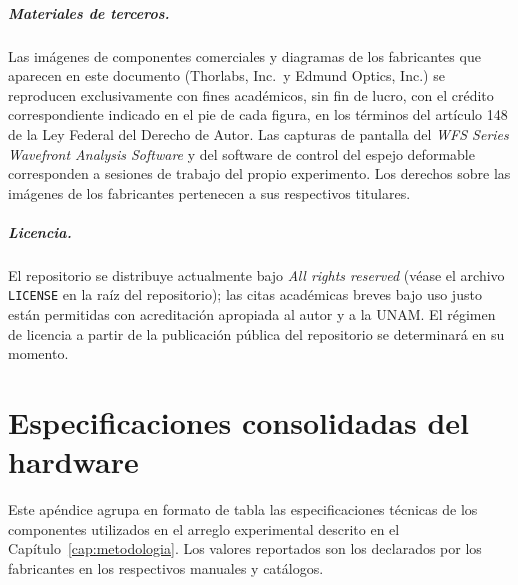 \documentclass[letterpaper,12pt,oneside]{book}
\begin{document}
\paragraph{Materiales de terceros.} Las imágenes de componentes comerciales y diagramas de
los fabricantes que aparecen en este documento (Thorlabs, Inc.\ y Edmund Optics, Inc.) se
reproducen exclusivamente con fines académicos, sin fin de lucro, con el crédito
correspondiente indicado en el pie de cada figura, en los términos del artículo 148 de la
Ley Federal del Derecho de Autor. Las capturas de pantalla del \textit{WFS Series
Wavefront Analysis Software} y del software de control del espejo deformable corresponden
a sesiones de trabajo del propio experimento. Los derechos sobre las imágenes de los
fabricantes pertenecen a sus respectivos titulares.

\paragraph{Licencia.} El repositorio se distribuye actualmente bajo \textit{All rights
reserved} (véase el archivo \texttt{LICENSE} en la raíz del repositorio); las citas
académicas breves bajo uso justo están permitidas con acreditación apropiada al autor y a
la UNAM. El régimen de licencia a partir de la publicación pública del repositorio se
determinará en su momento.

\chapter[Especificaciones del hardware]{Especificaciones consolidadas del hardware}\label{ap:hardware}

Este apéndice agrupa en formato de tabla las especificaciones técnicas de los componentes
utilizados en el arreglo experimental descrito en el Capítulo~\ref{cap:metodologia}. Los
valores reportados son los declarados por los fabricantes en los respectivos manuales y
catálogos.
\end{document}
